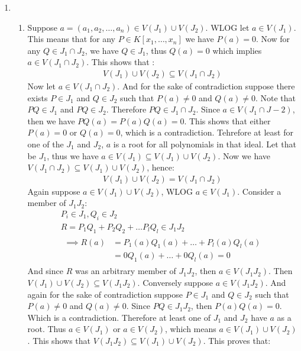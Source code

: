\begin{enumerate}[label=\ilabel]
    \item 
        \begin{enumerate}
            \item 
                Suppose $a = (a_1, a_2, \dots, a_n) \in V(J_1) \cup V(J_2)$. WLOG let $a \in V(J_1)$. This means that for any $P \in K[x_1, \dots, x_n]$ we have $P(a) = 0$.
                Now for any $Q \in J_1 \cap J_2$, we have $Q \in J_1$, thus $Q(a) = 0$ which implies $a \in V(J_1 \cap J_2)$. This shows that :
                \begin{gather*}
                    V(J_1) \cup V(J_2) \subseteq V(J_1 \cap J_2)
                \end{gather*}
                Now let $a \in V(J_1 \cap J_2)$. And for the sake of contradiction suppose there exists $P \in J_1$ and $Q \in J_2$ such that $P(a) \ne 0$ and $Q(a) \ne 0$. Note that $PQ \in J_1$ and $PQ \in J_2$. Therefore $PQ \in J_1 \cap J_2$. Since $a \in V(J_1 \cap J-2)$, then we have $PQ(a) = P(a) Q(a) = 0$. This shows that either $P(a) = 0$ or $Q(a) = 0$, which is a contradiction. Tehrefore at least for one of the $J_1$ and $J_2$, $a$ is a root for all polynomials in that ideal. Let that be $J_1$, thus we have $a \in V(J_1) \subseteq V(J_1) \cup V(J_2)$. Now we have $V(J_1 \cap J_2) \subseteq V(J_1) \cup V(J_2)$, hence:
                \begin{gather*}
                    V(J_1) \cup V(J_2) = V(J_1 \cap J_2)
                \end{gather*}
                Again suppose $a \in V(J_1) \cup V(J_2)$, WLOG $a \in V(J_1)$. Consider a member of $J_1J_2$: 
                \begin{gather*}
                    P_i \in J_1, Q_i \in J_2 \\
                    R = P_1 Q_1 + P_2 Q_2 + \dots P_l Q_l \in J_1J_2 \\
                    \begin{split}
                        \implies R(a) &= P_1(a) Q_1(a) + \dots + P_l(a) Q_l(a) \\
                        & = 0 Q_1(a) + \dots + 0 Q_l(a) = 0
                    \end{split}
                \end{gather*}
                And since $R$ was an arbitrary member of $J_1J_2$, then $a \in V(J_1J_2)$. Then $V(J_1) \cup V(J_2) \subseteq V(J_1J_2)$. Conversely suppose $a \in V(J_1J_2)$. 
                And again for the sake of contradiction suppose $P \in J_1$ and $Q \in J_2$ such that $P(a) \ne 0$ and $Q(a) \ne 0$. Since $PQ \in J_1J_2$, then $P(a) Q(a) = 0$. Which is a contradiction. Therefore at least one of $J_1$ and $J_2$ have $a$ as a root. Thus $a \in V(J_1)$ or $a \in V(J_2)$, which means $a \in V(J_1) \cup V(J_2)$. This shows that $V(J_1J_2) \subseteq V(J_1) \cup V(J_2)$. This proves that:

\end{enumerate}
\end{enumerate}
